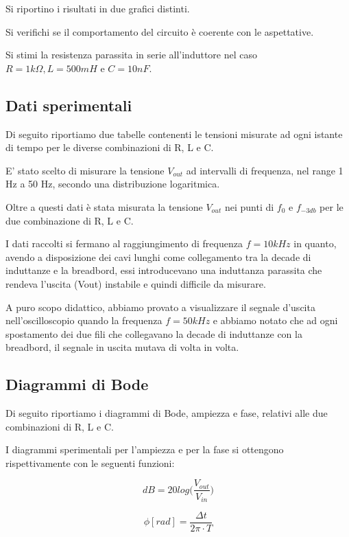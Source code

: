 \documentclass{article}
\begin{document}
Si riportino i risultati in due grafici distinti.

Si verifichi se il comportamento del circuito è coerente con le aspettative.

Si stimi la resistenza parassita in serie all'induttore nel caso $R = 1 k\Omega, L = 500 mH$ e $C = 10 nF$.

\subsection{Dati sperimentali}
Di seguito riportiamo due tabelle contenenti le tensioni misurate ad ogni istante di tempo per le diverse combinazioni di R, L e C.



E' stato scelto di misurare la tensione \textit{$V_{out}$} ad intervalli di frequenza, nel range 1 Hz a 50 Hz, secondo una distribuzione logaritmica.

Oltre a questi dati è stata misurata la tensione \textit{$V_{out}$} nei punti di $f_0$ e $f_{-3db}$ per le due combinazione di R, L e C. 

I dati raccolti si fermano al raggiungimento di frequenza $f = 10 kHz$ in quanto, avendo a disposizione dei cavi lunghi come collegamento tra la decade di induttanze e la breadbord, essi introducevano una induttanza parassita che rendeva l'uscita (Vout) instabile e quindi difficile da misurare.

A puro scopo didattico, abbiamo provato a visualizzare il segnale d'uscita nell'oscilloscopio quando la frequenza $f = 50 kHz$ e abbiamo notato che ad ogni spostamento dei due fili che collegavano la decade di induttanze con la breadbord, il segnale in uscita mutava di volta in volta.

\subsection{Diagrammi di Bode}
Di seguito riportiamo i diagrammi di Bode, ampiezza e fase, relativi alle due combinazioni di R, L e C.

\noindent
I diagrammi sperimentali per l’ampiezza e per la fase si ottengono rispettivamente con le seguenti funzioni:

\begin{minipage} [t]{0.45\textwidth}
    \begin{equation}
        dB = 20log \bigg ( \frac{V_{out}}{V_{in}} \bigg)
    \end{equation}
\end{minipage}
\hfill
 \begin{minipage} [t]{0.45\textwidth}
    \begin{equation}
        \phi[rad] = \frac{\Delta t}{2 \pi \cdot T} 
    \end{equation}
\end{minipage}
\end{document}
